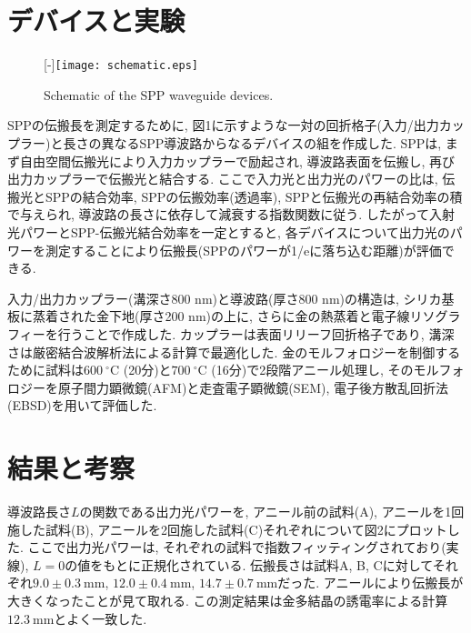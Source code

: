 \documentclass[a4,10truept]{jsarticle}
\begin{document}
\vspace{-0.7em}
\section{デバイスと実験}
\vspace{-0.7em}
\setlength{\columnsep}{1em}%
\begin{wrapfigure}{R}[0mm]{0.35\hsize}
  \centering
  \raisebox{0pt}[\dimexpr\height-\baselineskip\relax]{\texttt{[image: schematic.eps]}}
    \caption{Schematic of the SPP waveguide devices.}
     \label{fig:schematic}
\end{wrapfigure}
SPPの伝搬長を測定するために, 図1に示すような一対の回折格子(入力/出力カップラー)と長さの異なるSPP導波路からなるデバイスの組を作成した. SPPは, まず自由空間伝搬光により入力カップラーで励起され, 導波路表面を伝搬し, 再び出力カップラーで伝搬光と結合する. ここで入力光と出力光のパワーの比は, 伝搬光とSPPの結合効率, SPPの伝搬効率(透過率), SPPと伝搬光の再結合効率の積で与えられ, 導波路の長さに依存して減衰する指数関数に従う. したがって入射光パワーとSPP-伝搬光結合効率を一定とすると, 各デバイスについて出力光のパワーを測定することにより伝搬長(SPPのパワーが1/eに落ち込む距離)が評価できる. 

入力/出力カップラー(溝深さ800 nm)と導波路(厚さ800 nm)の構造は, シリカ基板に蒸着された金下地(厚さ200 nm)の上に, さらに金の熱蒸着と電子線リソグラフィーを行うことで作成した. カップラーは表面リリーフ回折格子であり, 溝深さは厳密結合波解析法による計算で最適化した. 
金のモルフォロジーを制御するために試料は$600\:\mathrm{^\circ C}$ (20分)と$700\:\mathrm{^\circ C}$ (16分)で2段階アニール処理し, そのモルフォロジーを原子間力顕微鏡(AFM)と走査電子顕微鏡(SEM), 電子後方散乱回折法(EBSD)を用いて評価した.

\vspace{-0.7em}
\section{結果と考察}
\vspace{-0.7em}
導波路長さ$L$の関数である出力光パワーを, アニール前の試料(A), アニールを1回施した試料(B), アニールを2回施した試料(C)それぞれについて図2にプロットした. ここで出力光パワーは, それぞれの試料で指数フィッティングされており(実線), $L=0$の値をもとに正規化されている. 伝搬長さは試料A, B, Cに対してそれぞれ$9.0\pm0.3\:\mathrm{mm}$, $12.0\pm0.4\:\mathrm{mm}$, $14.7\pm0.7\:\mathrm{mm}$だった. アニールにより伝搬長が大きくなったことが見て取れる. この測定結果は金多結晶の誘電率\cite{Palik}による計算$12.3\:\mathrm{mm}$とよく一致した. 
\end{document}

